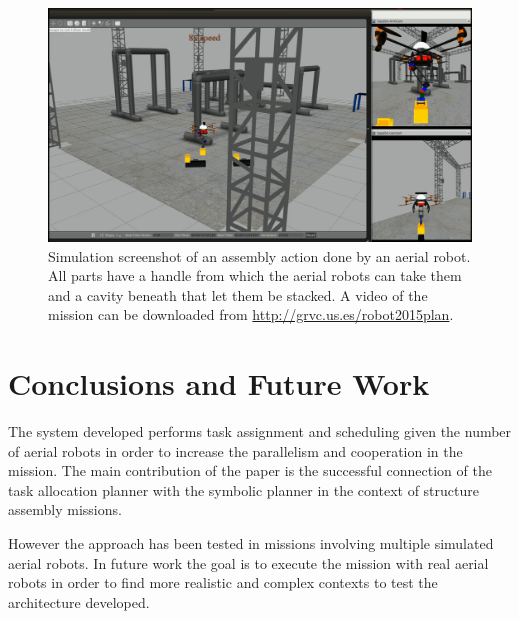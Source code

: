 \documentclass[runningheads,a4paper]{llncs}
\begin{document}
\begin{figure}
    \centering
    \includegraphics[width=0.75\columnwidth]{sim3.png}
    \caption[Simulation screenshot of an assembly action.]{Simulation screenshot of an assembly action done by an aerial robot. All parts have a handle from which the aerial robots can take them and a cavity beneath that let them be stacked. A video of the mission can be downloaded from \url{http://grvc.us.es/robot2015plan}.}
    \label{fig:sim2}
\end{figure}

\section{Conclusions and Future Work}
	\label{sec:conclusions}

The system developed performs task assignment and scheduling given the number of aerial robots in order to increase the parallelism and cooperation in the mission. The main contribution of the paper is the successful connection of the task allocation planner with the symbolic planner in the context of structure assembly missions.

However the approach has been tested in missions involving multiple simulated aerial robots. In future work the goal is to execute the mission with real aerial robots in order to find more realistic and complex contexts to test the architecture developed.



\end{document}
